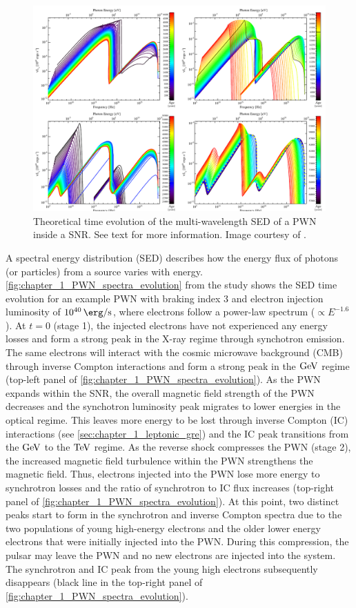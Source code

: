 \begin{figure}[h!]
    \centering
    \includegraphics[width=\textwidth]{04_Introduction/Images/pulsar_wind_nebula/pwn_spectra_evolution.pdf}
    \caption{Theoretical time evolution of the multi-wavelength SED of a PWN inside a SNR. See text for more information. Image courtesy of \cite{2009ApJ...703.2051G}.}
    \label{fig:chapter_1_PWN_spectra_evolution}
\end{figure}
A spectral energy distribution (SED) describes how the energy flux of photons (or particles) from a source varies with energy. \autoref{fig:chapter_1_PWN_spectra_evolution} from the study \cite{2009ApJ...703.2051G} shows the SED time evolution for an example PWN with braking index $3$ and electron injection luminosity of $10^{40}\,\ergspersec$, where electrons follow a power-law spectrum ($\propto E^{-1.6}$).
\newpar
At $t=0$ (stage 1), the injected electrons have not experienced any energy losses and form a strong peak in the X-ray regime through synchotron emission. The same electrons will interact with the cosmic microwave background (CMB) through inverse Compton interactions and form a strong peak in the $\si{\giga\electronvolt}$ regime  (top-left panel of \autoref{fig:chapter_1_PWN_spectra_evolution}). As the PWN expands within the SNR, the overall magnetic field strength of the PWN decreases and the synchotron luminosity peak migrates to lower energies in the optical regime. This leaves more energy to be lost through inverse Compton (IC) interactions (see \autoref{sec:chapter_1_leptonic_gre}) and the IC peak transitions from the $\si{\giga\electronvolt}$ to the $\TeV$ regime.
\newpar
As the reverse shock compresses the PWN (stage 2), the increased magnetic field turbulence within the PWN strengthens the magnetic field. Thus, electrons injected into the PWN lose more energy to synchrotron losses and the ratio of synchrotron to IC flux increases (top-right panel of \autoref{fig:chapter_1_PWN_spectra_evolution}). At this point, two distinct peaks start to form in the synchrotron and inverse Compton spectra due to the two populations of young high-energy electrons and the older lower energy electrons that were initially injected into the PWN. During this compression, the pulsar may leave the PWN and no new electrons are injected into the system. The synchrotron and IC peak from the young high electrons subsequently disappears (black line in the top-right panel of \autoref{fig:chapter_1_PWN_spectra_evolution}).
